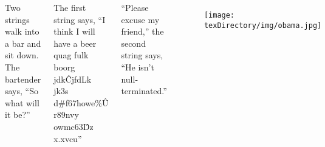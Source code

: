\documentclass[compress]{beamer}
\renewenvironment{quotation}
	{\list{}{
	        \leftmargin=3pt
	        \rightmargin=3pt
			}\item\relax}
	{\endlist}
\begin{document}
\begin{slide}
	\begin{columns}
	\begin{quotation} \scriptsize \normalfont

Two strings walk into a bar and sit down.
The bartender says, ``So what will it be?''

The first string says, ``I think I will have a beer quag fulk boorg jdk\^CjfdLk jk3s d\#f67howe\%\^U r89nvy owmc63\^Dz x.xvcu''

``Please excuse my friend,'' the second string says, ``He isn't null-terminated.''

	\end{quotation}
	\begin{figure}
	\texttt{[image: \\texDirectory/img/obama.jpg]}
	\end{figure}
	\end{columns}
\end{slide}
\end{document}
